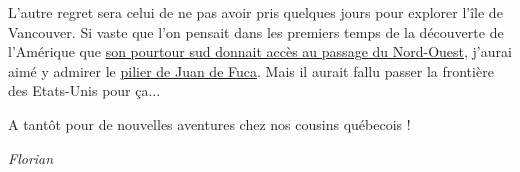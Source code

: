 L'autre regret sera celui de ne pas avoir pris quelques jours pour
explorer l'île de Vancouver. Si vaste que l'on pensait dans les premiers
temps de la découverte de l'Amérique que
\href{https://www.franceinter.fr/emissions/sur-les-epaules-de-darwin/sur-les-epaules-de-darwin-01-octobre-2016}{son
pourtour sud donnait accès au passage du Nord-Ouest}, j'aurai aimé y
admirer le
\href{https://fr.wikipedia.org/wiki/Cap_Flattery\#/media/File:CapeFlatteryWashington.jpg}{pilier
de Juan de Fuca}. Mais il aurait fallu passer la frontière des
Etats-Unis pour ça...

A tantôt pour de nouvelles aventures chez nos cousins québecois !

\emph{Florian}
